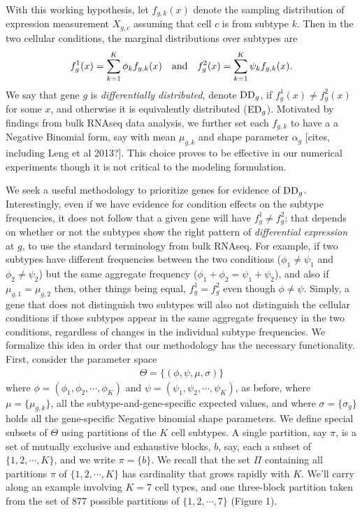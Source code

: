 \documentclass[11pt]{amsart}
\begin{document}
With this working hypothesis, let $f_{g,k}(x)$ denote the sampling distribution
of expression measurement $X_{g,c}$ assuming that cell $c$ is from subtype $k$.
Then in the two cellular conditions, the marginal distributions over subtypes are
\begin{eqnarray*}
f_g^1(x) = \sum_{k=1}^K \phi_k f_{g,k} (x) \quad {\mbox {\rm and}} \quad
f_g^2(x) = \sum_{k=1}^K \psi_k f_{g,k} (x).
\end{eqnarray*}
We say that gene $g$ is {\em differentially distributed}, denote ${\rm DD}_g$,
if $f_g^1(x) \neq f_g^2(x)$ for some $x$, and otherwise it is equivalently distributed
(${\rm ED}_g$). Motivated by findings from bulk RNAseq data analysis, we further
set each $f_{g,k}$ to have a a Negative Binomial form, say with mean $\mu_{g,k}$
and shape parameter $\alpha_g$ [cites, including Leng et al 2013?]. This choice
proves to be effective in our numerical experiments though it is not critical to
the modeling formulation.

We seek a useful methodology to prioritize genes for evidence
of ${\rm DD}_g$.  Interestingly, even if we have evidence for condition effects
on the subtype frequencies, it does not follow that a given
gene will have $f^1_g \neq f^2_g$; that depends on whether or not the subtypes
show the right pattern of {\em differential expression} at $g$, to use the 
standard terminology from bulk RNAseq.  For example, if two subtypes have 
different frequencies between the two conditions ($\phi_1 \neq \psi_1$ and 
 $\phi_2 \neq \psi_2$) but the same aggregate frequency
($\phi_1+\phi_2 = \psi_1 + \psi_2$),  and also  if $\mu_{g,1} = \mu_{g,2}$
then, other things being equal, $f^1_g = f^2_g$ even though $\phi \neq \psi$.
Simply, a gene that does not distinguish two subtypes will also not distinguish
the cellular conditions if those subtypes appear in the same aggregate frequency
in the two conditions, regardless of changes in the individual subtype 
frequencies. We formalize this idea in order that our methodology
has the necessary functionality.  First, consider the parameter space 
\begin{eqnarray*}
\Theta = \{ (\phi, \psi,\mu, \sigma)  \}
\end{eqnarray*}
where $\phi=(\phi_1, \phi_2, \cdots, \phi_K)$ and $\psi=(\psi_1, \psi_2, \cdots, \psi_K)$,
as before, where $\mu = \{ \mu_{g,k} \}$, all the subtype-and-gene-specific expected
values, and where $\sigma = \{ \sigma_g \}$ holds all the gene-specific Negative binomial
shape parameters.  We define special subsets of $\Theta$ using
partitions of the $K$ cell subtypes.  A single partition, say $\pi$, is a set of
mutually exclusive and exhaustive blocks, $b$, say, each a subset of $\{1, 2, 
\cdots, K\}$, and we write $\pi = \{ b \}$.  We recall 
that the set $\Pi$ containing all partitions $\pi$ of $\{1,2, \cdots, K\}$
has cardinality that grows rapidly with $K$. 
 We'll carry along an example
involving $K=7$ cell types, and one three-block partition taken
from the set of 877 possible partitions of $\{1, 2, \cdots, 7\}$ (Figure 1).
\end{document}
